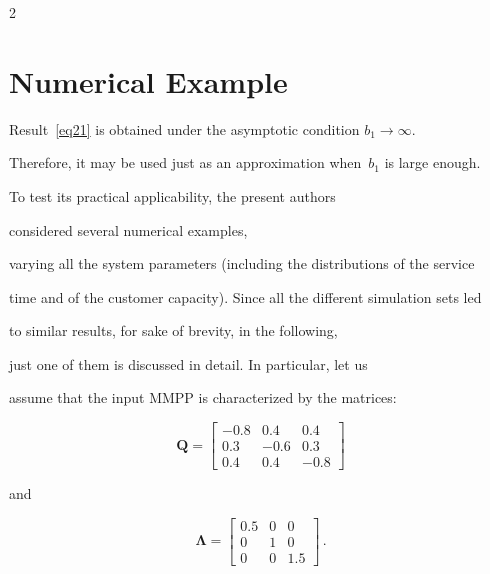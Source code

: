 \begin{multicols}{2}
\section{Numerical Example}





\noindent


Result~\eqref{eq21} is obtained under the asymptotic condition $b_1\to\infty$. 


Therefore, it may be used just as an approximation when~$b_1$ is large enough. 


To test its practical applicability, the present authors


 considered several numerical examples, 


varying all the system parameters (including the distributions of the service 


time and of the customer capacity). Since all the different simulation sets led 


to similar results, for sake of brevity, in the following, 


just one of them is discussed in detail. In particular, let us


assume that the input MMPP is characterized by the matrices:


$$


\mathbf{Q}=\left[


\begin{array}{rrr}


-0.8 & 0.4 & 0.4\\


0.3 & -0.6 & 0.3\\


0.4 & 0.4 & -0.8


\end{array}\right]


$$


and


$$


\mathbf{\Lambda}=\left[


\begin{array}{ccc}


0.5 & 0 & 0\\


0 & 1 & 0\\


0 & 0 & 1.5


\end{array}\right] \,.


$$






\end{multicols}
